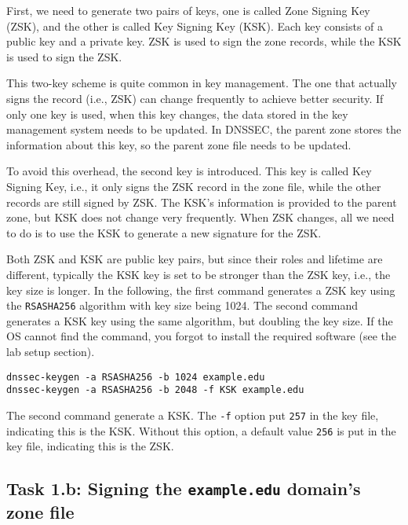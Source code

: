First, we need to generate two pairs of keys, one is called Zone Signing Key (ZSK), and 
the other is called Key Signing Key (KSK). Each key consists of a public key and a private key.
ZSK is used to sign the zone records, while the KSK is used to sign the ZSK. 

This two-key scheme is quite common in key management. The one that actually signs the record
(i.e., ZSK) can change frequently to achieve better security. If only one key is used,
when this key changes, the data stored in the key management system needs to be updated. 
In DNSSEC, the parent zone stores the information about this key, so the parent zone file
needs to be updated. 

To avoid this overhead, the second key is introduced. This key is called 
Key Signing Key, i.e., it only signs the ZSK record in the zone file, while the 
other records are still signed by ZSK. The KSK's information is provided to 
the parent zone, but KSK does not change very frequently. When ZSK changes,
all we need to do is to use the KSK to generate a new signature for the ZSK. 

Both ZSK and KSK are public key pairs, but since their roles and lifetime are different,
typically the KSK key is set to be stronger than the ZSK key, i.e., the key size 
is longer. In the following, the first command generates a ZSK key using the 
\texttt{RSASHA256} algorithm with key size being 1024. The second command 
generates a KSK key using the same algorithm, but doubling the key size. 
If the OS cannot find the command, you forgot to 
install the required software (see the lab setup section).


\begin{lstlisting}
dnssec-keygen -a RSASHA256 -b 1024 example.edu
dnssec-keygen -a RSASHA256 -b 2048 -f KSK example.edu
\end{lstlisting}

The second command generate a KSK. The \texttt{-f} option 
put \texttt{257} in the key file, indicating this is the KSK. 
Without this option, a default value \texttt{256} is put in
the key file, indicating this is the ZSK.




\subsection{Task 1.b: Signing the \texttt{example.edu} domain's zone file} 

